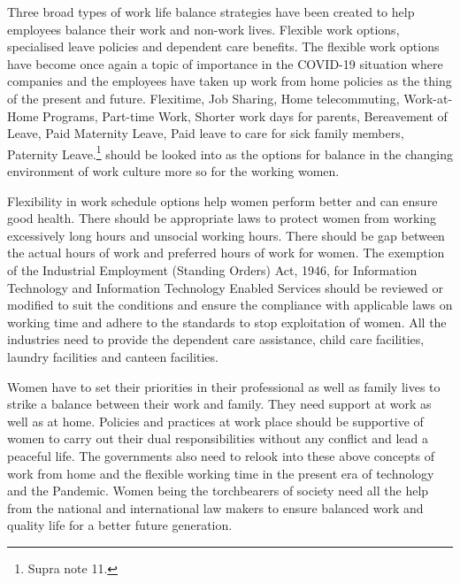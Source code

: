 \begin{multicols}{2}
\noi
Three broad types of work life balance strategies have been created to help employees
balance their work and non-work lives. Flexible work options, specialised leave policies and
dependent care benefits. The flexible work options have become once again a topic of
importance in the COVID-19 situation where companies and the employees have taken up
work from home policies as the thing of the present and future. Flexitime, Job Sharing, Home
telecommuting, Work-at-Home Programs, Part-time Work, Shorter work days for parents,
Bereavement of Leave, Paid Maternity Leave, Paid leave to care for sick family members,
Paternity Leave.\footnote{Supra note 11.} should be looked into as the options for balance in the changing
environment of work culture more so for the working women.

\noi
Flexibility in work schedule options help women perform better and can ensure good health.
There should be appropriate laws to protect women from working excessively long hours and
unsocial working hours. There should be gap between the actual hours of work and preferred
hours of work for women. The exemption of the Industrial Employment (Standing Orders)
Act, 1946, for Information Technology and Information Technology Enabled Services should
be reviewed or modified to suit the conditions and ensure the compliance with applicable
laws on working time and adhere to the standards to stop exploitation of women. All the industries need to provide the dependent care assistance, child care facilities, laundry facilities and canteen facilities. 

\noi
Women have to set their priorities in their professional as well as family lives to strike a
balance between their work and family. They need support at work as well as at home.
Policies and practices at work place should be supportive of women to carry out their dual
responsibilities without any conflict and lead a peaceful life. The governments also need to
relook into these above concepts of work from home and the flexible working time in the
present era of technology and the Pandemic. Women being the torchbearers of society need
all the help from the national and international law makers to ensure balanced work and
quality life for a better future generation.

\label{end2020-art10}

\end{multicols}

